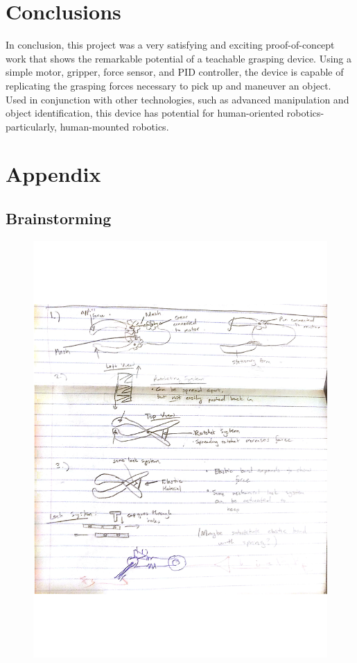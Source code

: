 \documentclass[letterpaper, 10 pt, conference]{ieeeconf}  %
\begin{document}
\section{Conclusions}

In conclusion, this project was a very satisfying and exciting proof-of-concept work that shows the remarkable potential of a teachable grasping device. Using a simple motor, gripper, force sensor, and PID controller, the device is capable of replicating the grasping forces necessary to pick up and maneuver an object. Used in conjunction with other technologies, such as advanced manipulation and object identification, this device has potential for human-oriented robotics- particularly, human-mounted robotics.

\section{Appendix}

\subsection{Brainstorming}

\begin{figure}[!htb]
	\includegraphics[width=\linewidth]{Brainstorming.pdf}
	\label{fig:brain}
\end{figure}
\FloatBarrier
\end{document}
